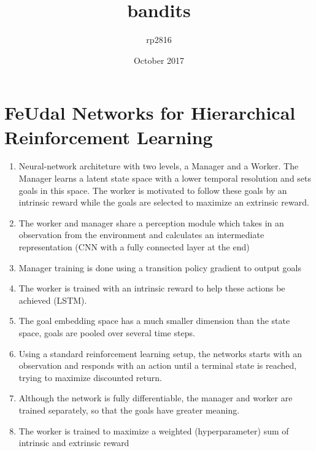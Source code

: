 \documentclass{article}
\title{bandits}
\author{rp2816 }
\date{October 2017}
\begin{document}
\maketitle

\section{FeUdal Networks for Hierarchical Reinforcement Learning}
\begin{enumerate}
\item Neural-network architeture with two levels, a Manager and a Worker. The Manager learns a latent state space with a lower temporal resolution and sets goals in this space. The worker is motivated to follow these goals by an intrinsic reward while the goals are selected to maximize an extrinsic reward.
\item The worker and manager share a perception module which takes in an observation from the environment and calculates an intermediate representation (CNN with a fully connected layer at the end)
\item Manager training is done using a transition policy gradient to output goals
\item The worker is trained with an intrinsic reward to help these actions be achieved (LSTM).
\item The goal embedding space has a much smaller dimension than the state space, goals are pooled over several time steps.
\item Using a standard reinforcement learning setup, the networks starts with an observation and responds with an action until a terminal state is reached, trying to maximize discounted return.
\item Although the network is fully differentiable, the manager and worker are trained separately, so that the goals have greater meaning.
\item The worker is trained to maximize a weighted (hyperparameter) sum of intrinsic and extrinsic reward

\end{enumerate}
\end{document}
